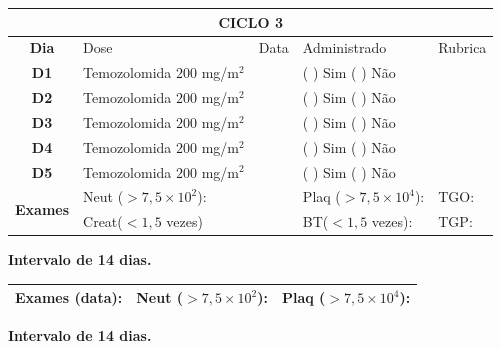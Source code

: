\documentclass[11pt,a4paper,oldfontcommands]{memoir}
\begin{document}
\begin{center}
\begin{longtable}{p{1cm}p{4cm}|p{1cm}|p{4.6cm}|p{3cm}}
	\hline
	\multicolumn{5}{c}{\textbf{CICLO 3}}\\
\hline
    \multicolumn{1}{c|}{\multirow{1}{*}{\textbf{Dia}}}&{Dose}&{Data}&{Administrado}&{Rubrica} \\
    \hline
    \multicolumn{1}{c|}{\multirow{1}{*}{\textbf{D1}}}&{Temozolomida \(200\) mg/m\(^2\)}&&{(  ) Sim (  ) Não}&\\
    \multicolumn{1}{c|}{\multirow{1}{*}{\textbf{D2}}}&{Temozolomida \(200\) mg/m\(^2\)}&&{(  ) Sim (  ) Não}&\\
    \multicolumn{1}{c|}{\multirow{1}{*}{\textbf{D3}}}&{Temozolomida \(200\) mg/m\(^2\)}&&{(  ) Sim (  ) Não}&\\
    \multicolumn{1}{c|}{\multirow{1}{*}{\textbf{D4}}}&{Temozolomida \(200\) mg/m\(^2\)}&&{(  ) Sim (  ) Não}&\\
    \multicolumn{1}{c|}{\multirow{1}{*}{\textbf{D5}}}&{Temozolomida \(200\) mg/m\(^2\)}&&{(  ) Sim (  ) Não}&\\
    \hline
    \multicolumn{1}{c|}{\multirow{2}{*}{\textbf{Exames}}}&\multicolumn{2}{l|}{Neut (\(>7,5\times10^2\)):}&{Plaq (\(>7,5\times10^4\)):}&{TGO:}\\
    \cline{2-5}
    \multicolumn{1}{c|}{\multirow{2}{*}{{}}}&\multicolumn{2}{l|}{Creat(\(<1,5\) vezes)}&{BT(\(<1,5\) vezes):}&{TGP:}
    \\
    \hline
\end{longtable}
\textbf{Intervalo de 14 dias.}
\begin{longtable}{p{5cm}|p{5cm}|p{4.5cm}}
    \hline
    \textbf{Exames (data):}&{Neut (\(>7,5\times10^2\)):}&{Plaq (\(>7,5\times10^4\)):}
    \\
    \hline
\end{longtable}
\clearpage
\textbf{Intervalo de 14 dias.}
\end{center}
\end{document}
